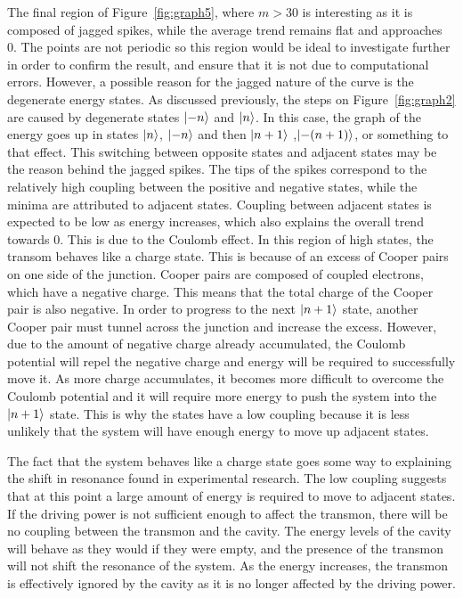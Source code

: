 \documentclass[11pt]{article}
\begin{document}
The final region of Figure~\ref{fig:graph5}, where $m>30$ is interesting as it is composed of jagged spikes, while the average trend remains flat and approaches 0. The points are not periodic so this region would be ideal to investigate further in order to confirm the result, and ensure that it is not due to computational errors. However, a possible reason for the jagged nature of the curve is the degenerate energy states. As discussed previously, the steps on Figure~\ref{fig:graph2} are caused by degenerate states $\ket{-n}$ and $\ket{n}$. In this case, the graph of the energy goes up in states $\ket{n}$, $\ket{-n}$ and then $\ket{n+1}$ ,$\ket{-(n+1)}$, or something to that effect. This switching between opposite states and adjacent states may be the reason behind the jagged spikes. The tips of the spikes correspond to the relatively high coupling between the positive and negative states, while the minima are attributed to adjacent states. Coupling between adjacent states is expected to be low as energy increases, which also explains the overall trend towards 0. This is due to the Coulomb effect. In this region of high states, the transom behaves like a charge state. This is because of an excess of Cooper pairs on one side of the junction. Cooper pairs are composed of coupled electrons, which have a negative charge. This means that the total charge of the Cooper pair is also negative. In order to progress to the next $\ket{n+1}$ state, another Cooper pair must tunnel across the junction and increase the excess. However, due to the amount of negative charge already accumulated, the Coulomb potential will repel the negative charge and energy will be required to successfully move it. As more charge accumulates, it becomes more difficult to overcome the Coulomb potential and it will require more energy to push the system into the $\ket{n+1}$ state. This is why the states have a low coupling because it is less unlikely that the system will have enough energy to move up adjacent states.

The fact that the system behaves like a charge state goes some way to explaining the shift in resonance found in experimental research. The low coupling suggests that at this point a large amount of energy is required to move to adjacent states. If the driving power is not sufficient enough to affect the transmon, there will be no coupling between the transmon and the cavity. The energy levels of the cavity will behave as they would if they were empty, and the presence of the transmon will not shift the resonance of the system. As the energy increases, the transmon is effectively ignored by the cavity as it is no longer affected by the driving power.
\end{document}
